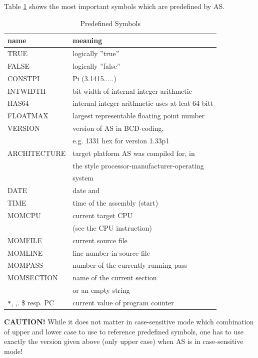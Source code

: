 \documentclass[12pt,twoside]{report}
\newcommand{\bb}[1]{{\bf #1}}
\newcommand{\asname}{{AS}}
\begin{document}
Table \ref{TabPredefined} shows the most important symbols which are
predefined by \asname{}.
\begin{table}[htb]
\begin{center}\begin{tabular}{|l|l|}
\hline
name          & meaning \\
\hline
\hline
TRUE          & logically ''true'' \\
FALSE         & logically ''false'' \\
CONSTPI       & Pi (3.1415.....) \\
INTWIDTH      & bit width of internal integer arithmetic \\
HAS64         & internal integer arithmetic uses at leat 64 bitt \\
FLOATMAX      & largest representable floating point number \\
VERSION       & version of \asname{} in BCD-coding, \\
              & e.g. 1331 hex for version 1.33p1 \\
ARCHITECTURE  & target platform \asname{} was compiled for, in \\
              & the style processor-manufacturer-operating \\
              & system \\
DATE          & date and \\
TIME          & time of the assembly (start) \\
MOMCPU        & current target CPU \\
              & (see the CPU instruction) \\
MOMFILE       & current source file \\
MOMLINE       & line number in source file \\
MOMPASS       & number of the currently running pass \\
MOMSECTION    & name of the current section \\
              & or an empty string \\
\verb!*!, ,. \$ resp. PC & current value of program counter \\
\hline
\end{tabular}\end{center}
\caption{Predefined Symbols\label{TabPredefined}}
\end{table}
\bb{CAUTION!}  While it does not matter in case-sensitive mode which
combination of upper and lower case to use to reference predefined
symbols, one has to use exactly the version given above (only upper
case) when \asname{} is in case-sensitive mode!
\end{document}
